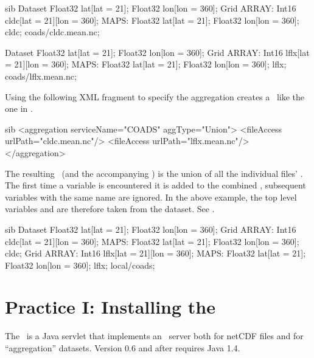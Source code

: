 \documentclass{dods-book}
\begin{document}
\begin{vcode}{sib}
Dataset {
  Float32 lat[lat = 21];
  Float32 lon[lon = 360];
  Grid {
    ARRAY:
      Int16 cldc[lat = 21][lon = 360];
    MAPS:
      Float32 lat[lat = 21];
      Float32 lon[lon = 360];
  } cldc;
} coads/cldc.mean.nc;

Dataset {
  Float32 lat[lat = 21];
  Float32 lon[lon = 360];
  Grid {
    ARRAY:
      Int16 lflx[lat = 21][lon = 360];
    MAPS:
      Float32 lat[lat = 21];
      Float32 lon[lon = 360];
  } lflx;
} coads/lflx.mean.nc;
\end{vcode}

Using the following XML fragment to specify the aggregation creates a
\dds\ like the one in .

\begin{vcode}{sib}
<aggregation serviceName="COADS" aggType="Union">
 <fileAccess urlPath="cldc.mean.nc"/>
 <fileAccess urlPath="lflx.mean.nc"/>
</aggregation>
\end{vcode}

The resulting \dds\ (and the accompanying \das ) is the union of all the
individual files' \dds . The first time a variable is encountered it is
added to the combined \dds , subsequent variables with the same name are
ignored. In the above example, the top level variables 
and  are therefore taken from the
 dataset.  See .

\begin{vcode}{sib}
Dataset {
  Float32 lat[lat = 21];
  Float32 lon[lon = 360];
  Grid {
    ARRAY:
      Int16 cldc[lat = 21][lon = 360];
    MAPS:
      Float32 lat[lat = 21];
      Float32 lon[lon = 360];
   } cldc;
  Grid {
    ARRAY:
      Int16 lflx[lat = 21][lon = 360];
    MAPS:
      Float32 lat[lat = 21];
      Float32 lon[lon = 360];
  } lflx;
} local/coads;
\end{vcode}

\chapter{Practice I: Installing the \AggServer}
\label{aggser,install}

The \aggser\ is a Java servlet that implements an \opendap\ server both
for  netCDF files and for ``aggregation'' datasets.  Version 0.6 and
after requires Java 1.4.  
\end{document}

